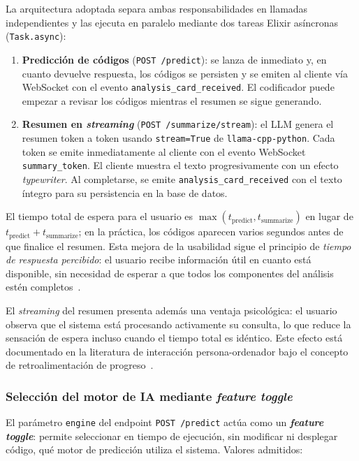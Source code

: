 La arquitectura adoptada separa ambas responsabilidades en llamadas independientes y las ejecuta en paralelo mediante dos tareas Elixir asíncronas (\texttt{Task.async}):

\begin{enumerate}
 \item \textbf{Predicción de códigos} (\texttt{POST /predict}): se lanza de inmediato y, en cuanto devuelve respuesta, los códigos se persisten y se emiten al cliente vía WebSocket con el evento \texttt{analysis\_card\_received}. El codificador puede empezar a revisar los códigos mientras el resumen se sigue generando.

 \item \textbf{Resumen en \emph{streaming}} (\texttt{POST /summarize/stream}): el LLM genera el resumen token a token usando \texttt{stream=True} de \texttt{llama-cpp-python}. Cada token se emite inmediatamente al cliente con el evento WebSocket \texttt{summary\_token}. El cliente muestra el texto progresivamente con un efecto \emph{typewriter}. Al completarse, se emite \texttt{analysis\_card\_received} con el texto íntegro para su persistencia en la base de datos.
\end{enumerate}

El tiempo total de espera para el usuario es $\max(t_{\text{predict}}, t_{\text{summarize}})$ en lugar de $t_{\text{predict}} + t_{\text{summarize}}$; en la práctica, los códigos aparecen varios segundos antes de que finalice el resumen. Esta mejora de la usabilidad sigue el principio de \emph{tiempo de respuesta percibido}: el usuario recibe información útil en cuanto está disponible, sin necesidad de esperar a que todos los componentes del análisis estén completos~\cite{Nielsen94}.

El \emph{streaming} del resumen presenta además una ventaja psicológica: el usuario observa que el sistema está procesando activamente su consulta, lo que reduce la sensación de espera incluso cuando el tiempo total es idéntico. Este efecto está documentado en la literatura de interacción persona-ordenador bajo el concepto de retroalimentación de progreso~\cite{Harrison07}.

\subsubsection{Selección del motor de IA mediante \emph{feature toggle}}
\label{sec:feature-toggle}

El parámetro \texttt{engine} del endpoint \texttt{POST /predict} actúa como un \textbf{\emph{feature toggle}}: permite seleccionar en tiempo de ejecución, sin modificar ni desplegar código, qué motor de predicción utiliza el sistema. Valores admitidos:

